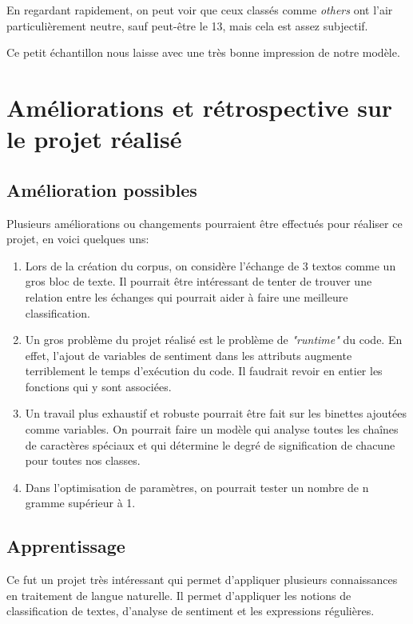 \documentclass[12pt,french]{article}
\begin{document}
En regardant rapidement, on peut voir que ceux classés comme \emph{others} ont l'air particulièrement neutre, sauf peut-être le 13, mais cela est assez subjectif.

Ce petit échantillon nous laisse avec une très bonne impression de notre modèle.

\clearpage
\section{Améliorations et rétrospective sur le projet réalisé}
\subsection*{Amélioration possibles}
Plusieurs améliorations ou changements pourraient être effectués pour réaliser ce projet, en voici quelques uns:

\begin{enumerate}
\item Lors de la création du corpus, on considère l'échange de 3 textos comme un gros bloc de texte. Il pourrait être intéressant de tenter de trouver une relation entre les échanges qui pourrait aider à faire une meilleure classification.

\item Un gros problème du projet réalisé est le problème de \emph{"runtime"} du code. En effet, l'ajout de variables de sentiment dans les attributs augmente terriblement le temps d'exécution du code. Il faudrait revoir en entier les fonctions qui y sont associées.

\item Un travail plus exhaustif et robuste pourrait être fait sur les binettes ajoutées comme variables. On pourrait faire un modèle qui analyse toutes les chaînes de caractères spéciaux et qui détermine le degré de signification de chacune pour toutes nos classes.

\item Dans l'optimisation de paramètres, on pourrait tester un nombre de n gramme supérieur à 1.
\end{enumerate}

\subsection*{Apprentissage}
Ce fut un projet très intéressant qui permet d'appliquer plusieurs connaissances en traitement de langue naturelle. Il permet d'appliquer les notions de classification de textes, d'analyse de sentiment et les expressions régulières.
\end{document}
